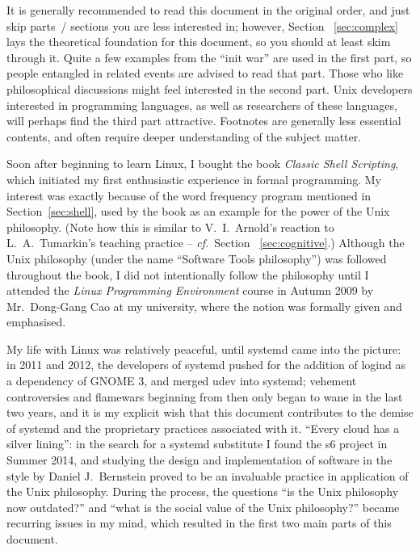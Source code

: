 \documentclass{article}
\newcommand*{\cf}{\emph{cf.}}
\begin{document}
It is generally recommended to read this document in the original order, and
just skip parts~/ sections you are less interested in; however, Section~%
\ref{sec:complex} lays the theoretical foundation for this document, so you
should at least skim through it.  Quite a few examples from the ``init war''
are used in the first part, so people entangled in related events are advised
to read that part.  Those who like philosophical discussions might feel
interested in the second part.  Unix developers interested in programming
languages, as well as researchers of these languages, will perhaps find
the third part attractive.  Footnotes are generally less essential
contents, and often require deeper understanding of the subject matter.





\newpart
\printbibliography[heading = bibintoc, title = References]
\newpage
{}\label{sec:afterword}

Soon after beginning to learn Linux, I bought the book \emph{Classic Shell
Scripting}, which initiated my first enthusiastic experience in formal
programming.  My interest was exactly because of the word frequency program
mentioned in Section~\ref{sec:shell}, used by the book as an example for the
power of the Unix philosophy.  (Note how this is similar to V.~I.\ Arnold's
reaction to L.~A.\ Tumarkin's teaching practice -- \cf~Section~%
\ref{sec:cognitive}.)  Although the Unix philosophy (under the name
``Software Tools philosophy'') was followed throughout the book, I did
not intentionally follow the philosophy until I attended the \emph{Linux
Programming Environment} course in Autumn 2009 by Mr.\ Dong-Gang Cao
at my university, where the notion was formally given and emphasised.

My life with Linux was relatively peaceful, until systemd came into the picture:
in 2011 and 2012, the developers of systemd pushed for the addition of logind
as a dependency of GNOME 3, and merged udev into
systemd; vehement controversies and flamewars beginning
from then only began to wane in the last two years,
and it is my explicit wish that this document contributes to the demise of
systemd and the proprietary practices associated with it.  ``Every cloud has
a silver lining'': in the search for a systemd substitute I found the s6 project
in Summer 2014, and studying the design and implementation of software in the
style by Daniel J.\ Bernstein proved to be an invaluable practice in application
of the Unix philosophy.  During the process, the questions ``is the Unix
philosophy now outdated?'' and ``what is the social value of the Unix
philosophy?'' became recurring issues in my mind, which resulted
in the first two main parts of this document.
\end{document}
